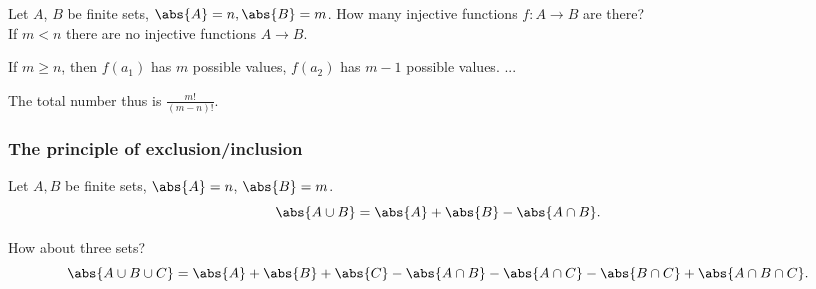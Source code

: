 \documentclass[english]{lbscript}
\begin{document}
\begin{proposition}{}{}
  Let \(A\), \(B\) be finite sets, \(\abs{A}=n, \abs{B}=m\). How many injective functions \(f:A→B\) are there?\\

  If \(m<n\) there are no injective functions \(A→B\).

  If \(m≥n\), then \(f(a_1)\) has \(m\) possible values, \(f(a_2)\) has \(m-1\) possible values. ...

  The total number thus is \(\frac{m!}{(m-n)!}\).
\end{proposition}

\subsubsection{The principle of exclusion/inclusion}
\label{sec:princ-excl}

\begin{proposition}{}{}
  Let \(A, B\) be finite sets, \(\abs{A}=n\), \(\abs{B}=m\).
  \begin{equation}
    \label{eq:7}
    \abs{A \cup B} = \abs{A} + \abs{B} - \abs{A \cap B}.
  \end{equation}

  How about three sets?
  \begin{equation}
    \label{eq:8}
    \abs{A\cup B \cup C} = \abs{A} + \abs{B} + \abs{C} - \abs{A\cap B} - \abs{A \cap C} - \abs{B \cap C} + \abs{A\cap B \cap C}.
  \end{equation}
\end{proposition}
\end{document}
